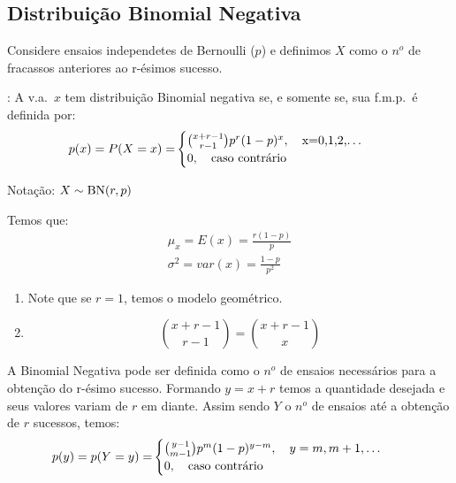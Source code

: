       \subsection{Distribuição Binomial Negativa}
      \begin{description}
        \item  Considere ensaios independetes de Bernoulli ($p$) e definimos $X$ como o $n^o$ 
      de fracassos anteriores ao r-ésimos sucesso.
    \item[Definição]: A v.a.\ $x$ tem distribuição Binomial negativa se, e somente se,
      sua f.m.p.\ é definida por:
      \begin{align}
        p(x)=P(X=x)=&
        \begin{cases}
          \binom{x+r-1}{r-1} p^r (1-p)^x, \text{\quad x=0,1,2,\dots} \\
          0, \text{\quad caso contrário}
        \end{cases}
      \end{align}
    \begin{center}Notação: $X \sim \operatorname{BN}(r,p)$\end{center}
      Temos que: 
      \begin{align}
        \mu_{x}=E(x)=\frac{r(1-p)}{p} \\
        \sigma^2 = var(x)=\frac{1-p}{p^2}
      \end{align}
      \begin{obs}
        \begin{enumerate}
        \item Note que se $r=1$, temos o modelo geométrico.
        \item $$\binom{x+r-1}{r-1} = \binom{x+r-1}{x}$$
      \end{enumerate}
    \end{obs}
  \item A Binomial Negativa pode ser definida como o $n^o$ de ensaios necessários para 
      a obtenção do r-ésimo sucesso. Formando $y=x+r$ temos a quantidade desejada e 
      seus valores variam de $r$ em diante. Assim sendo $Y$ o $n^o$ de ensaios até 
      a obtenção de $r$ sucessos, temos: 
      \begin{align}
        p(y)=p(Y=y)=&\begin{cases}
          \binom{y-1}{m-1}p^m(1-p)^{y-m}, \text{\quad }y=m,m+1,\dots \\
          0, \text{\quad caso contrário}
        \end{cases}
      \end{align}

\end{description}
